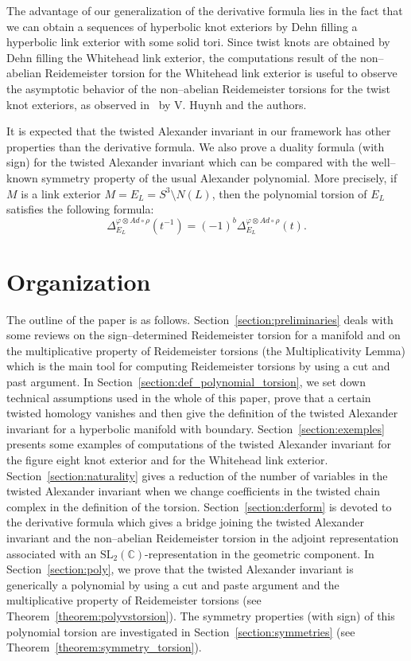 \documentclass[a4paper]{amsart}
\theoremstyle{plain}
\theoremstyle{definition}
\theoremstyle{remark}
\newcommand{\CC}{{\mathbb C}}
\newcommand{\SL}{{\mathrm{SL}_2(\CC)}}
\newcommand{\PolyTors}[2]{\Delta_{#1}^{#2}}
\newcommand{\otAd}[2]{#1 \otimes Ad \circ #2}
\begin{document}
The advantage of our generalization of the derivative formula lies in
the fact that we can obtain a sequences of hyperbolic knot exteriors
by Dehn filling a hyperbolic link exterior with some solid tori.
Since twist knots are obtained by Dehn filling the Whitehead link
exterior, the computations result of the non--abelian Reidemeister
torsion for the Whitehead link exterior is useful to observe the
asymptotic behavior of the non--abelian Reidemeister torsions for the
twist knot exteriors, as observed in~\cite{DuboisVuYam09:RTorsionTwistKnots} by
V. Huynh and the authors.

It is expected that the twisted Alexander invariant in our framework
has other properties than the derivative formula.  We also prove a duality formula (with sign) for the twisted Alexander invariant which can be compared with the well--known symmetry property of the usual Alexander polynomial. More precisely, if $M$ is a link exterior $M = E_L = S^3 \setminus N(L)$, then
the polynomial torsion of $E_L$ satisfies the following formula:
\[
    \PolyTors{E_L}{\otAd{\varphi}{\rho}}(t^{-1}) 
      =(-1)^b \PolyTors{E_L}{\otAd{\varphi}{\rho}}(t). 
\]%

\section*{Organization}
The outline of the paper is as follows.
Section~\ref{section:preliminaries} deals with some reviews on the
sign--determined Reidemeister torsion for a manifold and on the
multiplicative property of Reidemeister torsions (the Multiplicativity
Lemma) which is the main tool for computing Reidemeister torsions by
using a cut and past argument. In
Section~\ref{section:def_polynomial_torsion}, we set down technical
assumptions used in the whole of this paper, prove that a certain
twisted homology vanishes and then give the definition of the twisted
Alexander invariant for a hyperbolic manifold with boundary.
Section~\ref{section:exemples} presents some examples of computations
of the twisted Alexander invariant for the figure eight knot exterior
and for the Whitehead link exterior.  Section~\ref{section:naturality}
gives a reduction of the number of variables in the twisted Alexander
invariant when we change coefficients in the twisted chain complex in
the definition of the torsion.  Section~\ref{section:derform} is
devoted to the derivative formula which gives a bridge joining the
twisted Alexander invariant and the non--abelian Reidemeister torsion in the adjoint
representation associated with an $\SL$-representation in the geometric
component.  In Section~\ref{section:poly}, we prove that the twisted
Alexander invariant is generically a polynomial by using a cut and
paste argument and the multiplicative property of Reidemeister
torsions (see Theorem~\ref{theorem:polyvstorsion}). The symmetry
properties (with sign) of this polynomial torsion are investigated in
Section~\ref{section:symmetries} (see
Theorem~\ref{theorem:symmetry_torsion}).
\end{document}
